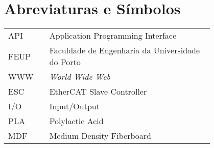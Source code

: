 \chapter*{Abreviaturas e Símbolos}

\begin{flushleft}
\begin{tabular}{l p{0.8\linewidth}}
API      & Application Programming Interface\\
FEUP     & Faculdade de Engenharia da Universidade do Porto\\
WWW      & \emph{World Wide Web}\\
ESC      & EtherCAT Slave Controller\\
I/O      & Input/Output\\
PLA      & Polylactic Acid\\
MDF      & Medium Density Fiberboard\\
\end{tabular}
\end{flushleft}

